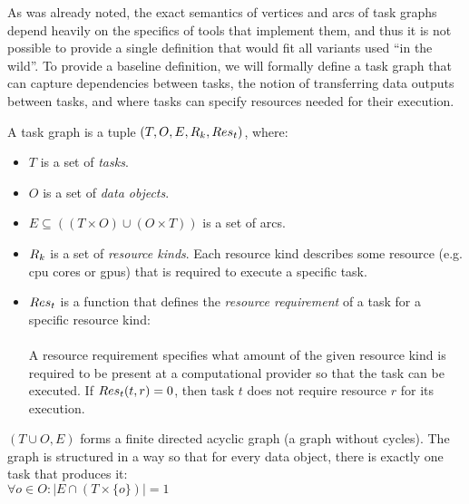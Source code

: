 As was already noted, the exact semantics of vertices and arcs of task graphs depend heavily on the
specifics of tools that implement them, and thus it is not possible to provide a single definition
that would fit all variants used ``in the wild''. To provide a baseline definition, we will
formally define a task graph that can capture dependencies between tasks, the notion of
transferring data outputs between tasks, and where tasks can specify resources needed for their
execution.

\newcommand{\alltaskpairs}{\forall t_1\in{}T, \forall t_2\in{}T}

A task graph is a tuple $(T, O, E, R_k, Res_t)$, where:
\begin{itemize}[itemsep=0pt]
	\item $T$ is a set of \emph{tasks}.
	\item $O$ is a set of \emph{data objects}.
	\item $E \subseteq ((T\times{}O) \cup (O\times{}T))$ is a set of arcs.
	\item $R_k$ is a set of \emph{resource kinds}. Each resource kind describes some resource
	      (e.g. \gls{cpu} cores or \glspl{gpu})
	      that is required to execute a specific task.
	\item[\makedef{def:task_resreq}] $Res_t$ is a function that defines the
		\emph{resource requirement} of a task for a specific resource kind: \\
		 \\
		A resource requirement specifies what amount of the given resource kind is required to be present
		at a computational provider so that the task can be executed. If $Res_t(t, r) = 0$, then task
		$t$ does not require resource $r$ for its execution.
\end{itemize}

$(T \cup O, E)$ forms a finite directed acyclic graph (a graph without cycles). The graph is
structured in a way so that for every data object, there is exactly one task that produces it: \\
$\forall o \in O: |E \cap (T \times \{o\})| = 1$

